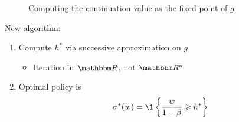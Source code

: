 \begin{frame}

    \begin{figure}
        \centering
        \caption{\label{f:iid_job_search_4} Computing the continuation value as the fixed point of $g$}
    \end{figure}

\end{frame}


\begin{frame}
    
    New algorithm:

    \begin{enumerate}
        \item Compute $h^*$ via successive approximation on $g$
            \vspace{1em}
            \begin{itemize}
                \item Iteration in $\RR$, not $\RR^n$
            \end{itemize}
            \vspace{1em}
        \item Optimal policy is 
            \begin{equation*}
                \sigma^*(w)
                = \1
                \left\{
                    \frac{w}{1-\beta}
                    \geq
                    h^*
                \right\}
            \end{equation*}
    \end{enumerate}

\end{frame}















